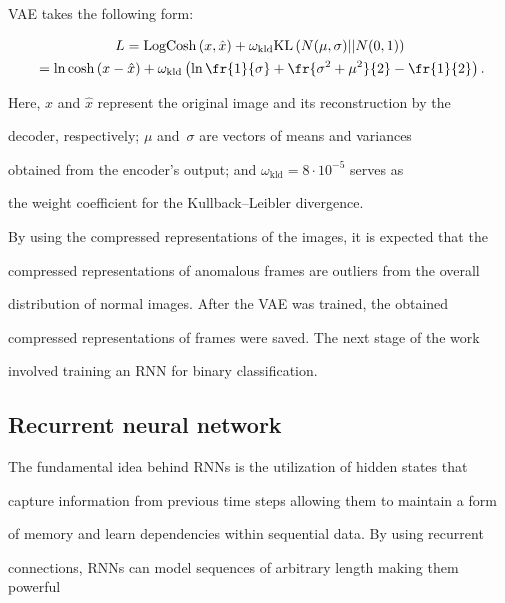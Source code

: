 VAE takes the following form:

    \begin{multline*}

            L = \mathrm{LogCosh}\left(x, \hat{x}\right) + \omega_{\mathrm{kld}}  \mathrm{KL}\,(N(\mu, \sigma) || 

N(0, 1)) \\

         {}=   \ln{\cosh\left(x - \hat{x}\right)} + \omega_{\mathrm{kld}} \left( \ln 

\fr{1}{\sigma} + \fr{\sigma^2 + \mu^2}{2} - \fr{1}{2} \right).

        \end{multline*}

Here, $x$ and $\hat{x}$ represent the original image and its reconstruction by the 

decoder, respectively; $\mu$ and~$\sigma$ are vectors of means and variances 

obtained from the encoder's output; and $\omega_{\mathrm{kld}} = 8\cdot 10^{-5}$ serves as 

the weight coefficient for the Kullback--Leibler divergence.



By using the compressed representations of the images, it is expected that the 

compressed representations of anomalous frames are outliers from the overall 

distribution of normal images. After the VAE was trained, the obtained 

compressed representations of frames were saved. The next stage of the work 

involved training an RNN for binary classification.



\subsection{Recurrent neural network}



\noindent

The fundamental idea behind RNNs is the utilization of hidden states that 

capture information from previous time steps allowing them to maintain a form 

of memory and learn dependencies within sequential data. By using recurrent 

connections, RNNs can model sequences of arbitrary length making them powerful 

